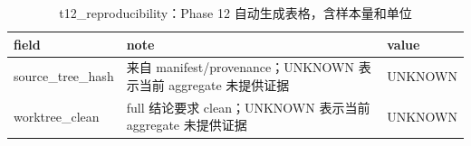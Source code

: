 \begin{table}[htbp]
\centering
\caption{t12_reproducibility：Phase 12 自动生成表格，含样本量和单位}
\begin{tabular}{lll}
\hline
field & note & value \\
\hline
source\_tree\_hash & 来自 manifest/provenance；UNKNOWN 表示当前 aggregate 未提供证据 & UNKNOWN \\
worktree\_clean & full 结论要求 clean；UNKNOWN 表示当前 aggregate 未提供证据 & UNKNOWN \\
\hline
\end{tabular}
\end{table}
